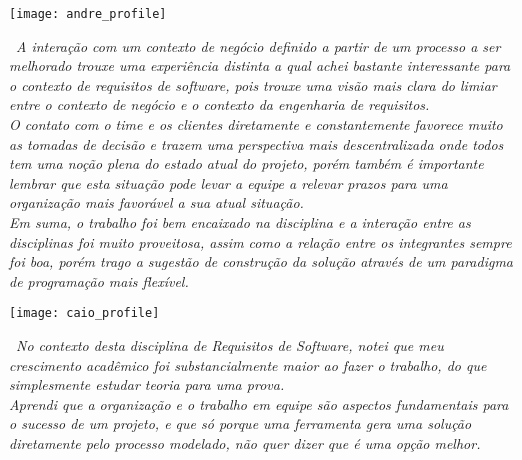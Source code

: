 \vspace*{\fill}
\begin{center}
	\texttt{[image: andre\_profile]}
\end{center}
\ \indent \emph{A interação com um contexto de negócio definido a partir de um processo a ser melhorado trouxe uma experiência distinta a qual achei bastante interessante para o contexto de requisitos de software, pois trouxe uma visão mais clara do limiar entre o contexto de negócio e o contexto da engenharia de requisitos.}
\\ \indent \emph{O contato com o time e os clientes diretamente e constantemente favorece muito as tomadas de decisão e trazem uma perspectiva mais descentralizada onde todos tem uma noção plena do estado atual do projeto, porém também é importante lembrar que esta situação pode levar a equipe a relevar prazos para uma organização mais favorável a sua atual situação.}
\\ \indent \emph{Em suma, o trabalho foi bem encaixado na disciplina e a interação entre as disciplinas foi muito proveitosa, assim como a relação entre os integrantes sempre foi boa, porém trago a sugestão de construção da solução através de um paradigma de programação mais flexível.}
\vspace*{\fill}

\newpage
\vspace*{\fill}
\begin{center}
	\texttt{[image: caio\_profile]}
\end{center}
\ \indent \emph{No contexto desta disciplina de Requisitos de Software, notei que meu crescimento acadêmico foi substancialmente maior ao fazer o trabalho, do que simplesmente estudar teoria para uma prova.}
\\ \indent \emph{Aprendi que a organização e o trabalho em equipe são aspectos fundamentais para o sucesso de um projeto, e que só porque uma ferramenta gera uma solução diretamente pelo processo modelado, não quer dizer que é uma opção melhor.}
\vspace*{\fill}

